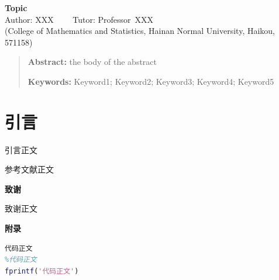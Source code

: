 \documentclass[11pt,a4paper]{article}
\begin{document}
\begin{center}
		\Large{\textbf {Topic} }%
		\\
		\large{ Author: XXX ~~~~Tutor: Professor~XXX  %
			\\
			(College of Mathematics and Statistics, Hainan Normal University, Haikou, 571158)}
\end{center}
\renewcommand\baselinestretch{1.4}\selectfont
\begin{quotation} \textbf{Abstract:}
		the body of the abstract
		
	\textbf{Keywords:} Keyword1; Keyword2; Keyword3; Keyword4; Keyword5
\end{quotation}\par

\newpage
{}
\section{引言}

引言正文


\renewcommand\baselinestretch{1.1}\selectfont
\renewcommand\refname{\textbf{参考文献}}
\begin{thebibliography}{99}
	\fangsong
	
	参考文献正文
	
\end{thebibliography}


\renewcommand\baselinestretch{1.4}\selectfont
{}
\begin{flushleft}
	\textbf{致谢}
\end{flushleft}

致谢正文


\begin{flushleft}
	\textbf{附录}
\end{flushleft}

\begin{appendices}
	\begin{lstlisting}[language=matlab]			
代码正文
%代码正文
fprintf('代码正文')
	\end{lstlisting}
\end{appendices}
\end{document}
